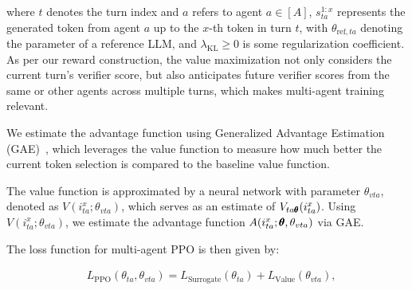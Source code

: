 \noindent where $t$ denotes the turn index and $a$ refers to agent  $a \in [A]$, $s_{ta}^{1:x}$ represents the generated token from agent $a$ up to the $x$-th token in turn $t$, with $\theta_{\text{ref},ta}$  denoting the parameter of a reference LLM, and  \( \lambda_{\text{KL}}\geq 0\) is some regularization coefficient. As per our reward construction, the value maximization 
not only considers the current turn’s verifier score,  but also anticipates future verifier scores from the same or other agents across multiple turns, which makes multi-agent training {relevant}. {We estimate the advantage function using Generalized Advantage Estimation (GAE)~\citep{schulman2015high}, which leverages the value function to measure how much better the current token selection is compared to the baseline value function.  

The value function is approximated by a neural network with parameter \(\theta_{vta}\), denoted as \(V(i_{ta}^x;\theta_{vta})\), which serves as an estimate of \(V_{ta\pmb{\theta}}(i_{ta}^x)\). Using \(V(i_{ta}^x;\theta_{vta})\), we estimate the advantage function \(A(i_{ta}^x;\pmb{\theta}, \theta_{vta})\) via GAE. } The loss function for multi-agent PPO is then given by: 
\vspace{-7mm}


\begin{align*}
    &L_{\text{PPO}}(\theta_{ta}, \theta_{vta})  = L_{\text{Surrogate}}(\theta_{ta}) + L_{\text{Value}}(\theta_{vta}),
\end{align*}
\vspace{-8mm}

